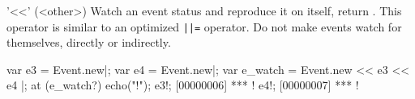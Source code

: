 \begin{urbiscriptapi}
\item['<<'](<other>)%
  Watch an  event status and reproduce it on itself, return
  \this.  This operator is similar to an optimized \lstinline,||=, operator.
  Do not make events watch for themselves, directly or indirectly.

\begin{urbiscript}
var e3 = Event.new|;
var e4 = Event.new|;
var e_watch = Event.new << e3 << e4 |;
at (e_watch?)
  echo("!");
e3!;
[00000006] *** !
e4!;
[00000007] *** !
\end{urbiscript}


\end{urbiscriptapi}

